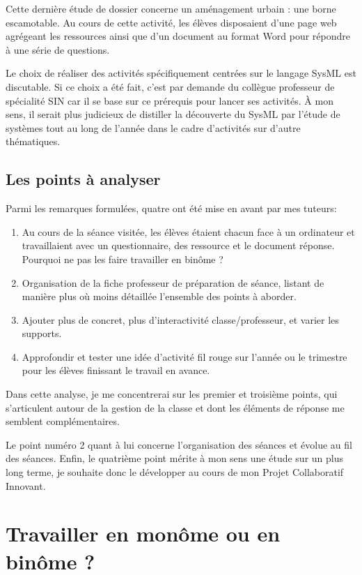 \documentclass[pdftex,a4paper,12pt]{article}
\begin{document}
	Cette dernière étude de dossier concerne un aménagement urbain : une borne escamotable.
	Au cours de cette activité, les élèves disposaient d'une page web agrégeant les ressources ainsi que
	d'un document au format Word pour répondre à une série de questions. 
	
	Le choix de réaliser des activités spécifiquement centrées sur le langage SysML est discutable. 
	Si ce choix a été fait, c'est par demande du collègue professeur de spécialité SIN car il se base sur ce prérequis pour lancer ses activités.
	À mon sens, il serait plus judicieux de distiller la découverte du SysML par l'étude de systèmes tout au long de l'année 
	dans le cadre d'activités sur d'autre thématiques.

	\subsection{Les points à analyser}
	Parmi les remarques formulées, quatre ont été mise en avant par mes tuteurs:
	\begin{enumerate}
		\item Au cours de la séance visitée, les élèves étaient chacun face à un ordinateur et travaillaient avec un questionnaire, des ressource et le document réponse. 
			Pourquoi ne pas les faire travailler en binôme ?
		\item Organisation de la fiche professeur de préparation de séance, listant de manière plus où moins détaillée l'ensemble des points à aborder.
		\item Ajouter plus de concret, plus d'interactivité classe/professeur, et varier les supports.
		\item Approfondir et tester une idée d'activité \og{}fil rouge\fg{} sur l'année ou le trimestre pour les élèves finissant le travail en avance.
	\end{enumerate}

	Dans cette analyse, je me concentrerai sur les premier et troisième points, qui s'articulent autour de la gestion de la classe 
	et dont les éléments de réponse me semblent complémentaires.

	Le point numéro 2 quant à lui concerne l'organisation des séances et évolue au fil des séances.
	Enfin, le quatrième point mérite à mon sens une étude sur un plus long terme, je souhaite donc le développer au cours de mon \og{}Projet Collaboratif Innovant\fg{}.

	\section{Travailler en monôme ou en binôme ?}
\end{document}
